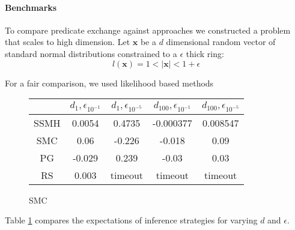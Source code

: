 


\paragraph{Benchmarks}
To compare predicate exchange against approaches we constructed a problem that scales to high dimension.
Let $\textbf{x}$ be a $d$ dimensional random vector of standard normal distributions constrained to a $\epsilon$ thick ring:
\begin{equation}
l(\textbf{x}) = 1 < |\textbf{x}| < 1 + \epsilon
\end{equation}

For a fair comparison, we used likelihood based methods


\begin{figure}
\begin{center}
	\begin{tabular}{||c| c c c c||} 
	\hline
	 & $d_1, \epsilon_{10^{-1}}$ & $d_1, \epsilon_{10^{-5}}$ & $d_{100}, \epsilon_{10^{-1}}$ & $d_{100}, \epsilon_{10^{-5}}$ \\ [0.5ex] 
	\hline\hline
	SSMH & 0.0054 & 0.4735  & -0.000377 & 0.008547\\ 
	\hline
	SMC & 0.06 & -0.226  & -0.018 & 0.09\\ 
	\hline
	PG & -0.029 & 0.239 & -0.03 & 0.03\\
	\hline
	RS & 0.003 & timeout & timeout & timeout \\
	\hline
 \end{tabular}
 \label{results}
 \caption{SMC}
 \end{center}
\end{figure}


  
Table \ref{results} compares the expectations of inference strategies for varying $d$ and $\epsilon$.

